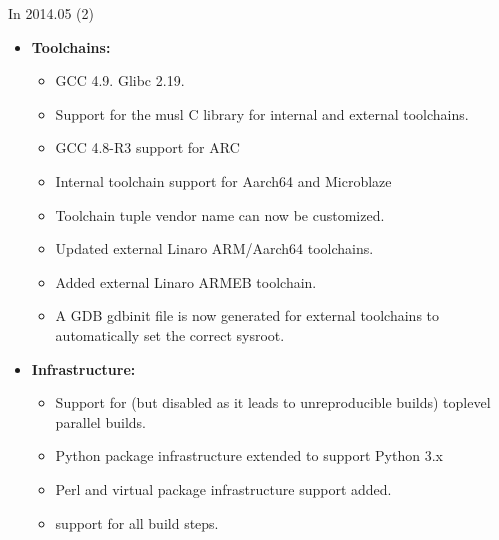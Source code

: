 \begin{frame}{In 2014.05 (2)}
  \begin{itemize}
  \item {\bf Toolchains:}
    \begin{itemize}
    \item GCC 4.9. Glibc 2.19.
    \item Support for the musl C
      library for internal and external toolchains.
    \item GCC 4.8-R3 support for ARC
    \item Internal toolchain support for Aarch64 and
      Microblaze
    \item Toolchain tuple vendor name can now be
      customized.
    \item Updated external Linaro ARM/Aarch64
      toolchains.
    \item Added external Linaro ARMEB toolchain.
    \item A GDB gdbinit file is now generated for external toolchains
      to automatically set the correct sysroot.
    \end{itemize}
  \item {\bf Infrastructure:}
    \begin{itemize}
    \item Support for (but disabled as it leads to
      unreproducible builds) toplevel parallel builds.
    \item Python package infrastructure extended to support Python 3.x
    \item Perl and virtual package infrastructure support added.
    \item {} support for all build steps.
    \end{itemize}
  \end{itemize}
\end{frame}

